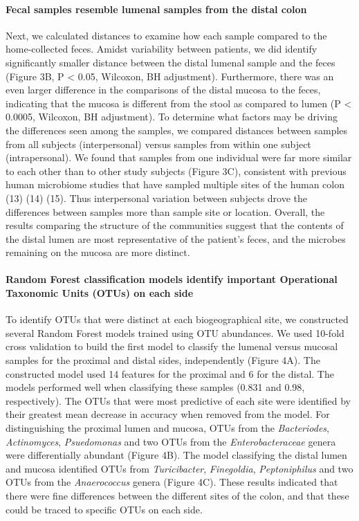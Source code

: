 \documentclass[11pt,]{article}
\let\oldparagraph\paragraph
\renewcommand{\paragraph}[1]{\oldparagraph{#1}\mbox{}}
\begin{document}
\paragraph{Fecal samples resemble lumenal samples from the distal
colon}\label{fecal-samples-resemble-lumenal-samples-from-the-distal-colon}

Next, we calculated distances to examine how each sample compared to the
home-collected feces. Amidst variability between patients, we did
identify significantly smaller distance between the distal lumenal
sample and the feces (Figure 3B, P \textless{} 0.05, Wilcoxon, BH
adjustment). Furthermore, there was an even larger difference in the
comparisons of the distal mucosa to the feces, indicating that the
mucosa is different from the stool as compared to lumen (P \textless{}
0.0005, Wilcoxon, BH adjustment). To determine what factors may be
driving the differences seen among the samples, we compared distances
between samples from all subjects (interpersonal) versus samples from
within one subject (intrapersonal). We found that samples from one
individual were far more similar to each other than to other study
subjects (Figure 3C), consistent with previous human microbiome studies
that have sampled multiple sites of the human colon (13) (14) (15). Thus
interpersonal variation between subjects drove the differences between
samples more than sample site or location. Overall, the results
comparing the structure of the communities suggest that the contents of
the distal lumen are most representative of the patient's feces, and the
microbes remaining on the mucosa are more distinct.

\paragraph{Random Forest classification models identify important
Operational Taxonomic Units (OTUs) on each
side}\label{random-forest-classification-models-identify-important-operational-taxonomic-units-otus-on-each-side}

To identify OTUs that were distinct at each biogeographical site, we
constructed several Random Forest models trained using OTU abundances.
We used 10-fold cross validation to build the first model to classify
the lumenal versus mucosal samples for the proximal and distal sides,
independently (Figure 4A). The constructed model used 14 features for
the proximal and 6 for the distal. The models performed well when
classifying these samples (0.831 and 0.98, respectively). The OTUs that
were most predictive of each site were identified by their greatest mean
decrease in accuracy when removed from the model. For distinguishing the
proximal lumen and mucosa, OTUs from the \emph{Bacteriodes},
\emph{Actinomyces}, \emph{Psuedomonas} and two OTUs from the
\emph{Enterobacteraceae} genera were differentially abundant (Figure
4B). The model classifying the distal lumen and mucosa identified OTUs
from \emph{Turicibacter}, \emph{Finegoldia}, \emph{Peptoniphilus} and
two OTUs from the \emph{Anaerococcus} genera (Figure 4C). These results
indicated that there were fine differences between the different sites
of the colon, and that these could be traced to specific OTUs on each
side.
\end{document}
